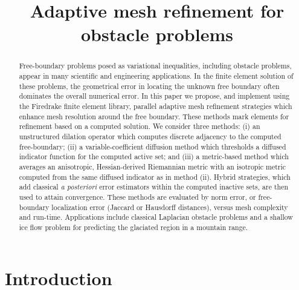 \documentclass[]{interact}
\theoremstyle{plain}%
\theoremstyle{definition}
\theoremstyle{remark}
\begin{document}

\title{Adaptive mesh refinement for obstacle problems}

\author{
}

\maketitle

\begin{abstract}
Free-boundary problems posed as variational inequalities, including obstacle problems, appear in many scientific and engineering applications.  In the finite element solution of these problems, the geometrical error in locating the unknown free boundary often dominates the overall numerical error.  In this paper we propose, and implement using the Firedrake finite element library, parallel adaptive mesh refinement strategies which enhance mesh resolution around the free boundary.  These methods mark elements for refinement based on a computed solution.  We consider three methods: (i) an unstructured dilation operator which computes discrete adjacency to the computed free-boundary; (ii) a variable-coefficient diffusion method which thresholds a diffused indicator function for the computed active set; and (iii) a metric-based method which averages an anisotropic, Hessian-derived Riemannian metric with an isotropic metric computed from the same diffused indicator as in method (ii).  Hybrid strategies, which add classical \emph{a posteriori} error estimators within the computed inactive sets, are then used to  attain convergence.  These methods are evaluated by norm error, or free-boundary localization error (Jaccard or Hausdorff distances), versus mesh complexity and run-time.  Applications include classical Laplacian obstacle problems and a shallow ice flow problem for predicting the glaciated region in a mountain range.
\end{abstract}



\section{Introduction} \label{sec:intro}
\end{document}
